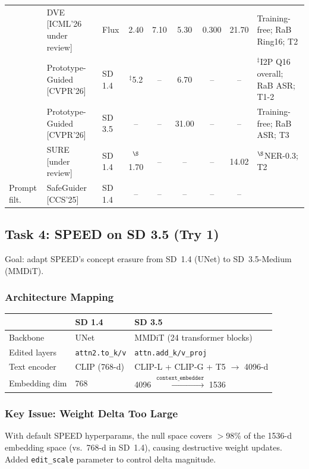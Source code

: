 \documentclass[11pt,a4paper]{article}
\begin{document}
\begin{table}[H]
\begin{tabularx}{\textwidth}{@{} p{1.5cm} p{2cm} l c c c c c X @{}}
 & DVE \scriptsize{[ICML'26 under review]} & Flux & 2.40 & 7.10 & 5.30 & 0.300 & 21.70 & Training-free; RaB Ring16; T2 \\
 & Prototype-Guided \scriptsize{[CVPR'26]} & SD 1.4 & $^\ddagger$5.2 & -- & 6.70 & -- & -- & $^\ddagger$I2P Q16 overall; RaB ASR; T1-2 \\
 & Prototype-Guided \scriptsize{[CVPR'26]} & SD 3.5 & -- & -- & 31.00 & -- & -- & Training-free; RaB ASR; T3 \\
 & SURE \scriptsize{[under review]} & SD 1.4 & $^\S$1.70 & -- & -- & -- & 14.02 & $^\S$NER-0.3; T2 \\
\midrule
Prompt filt. & SafeGuider \scriptsize{[CCS'25]} & SD 1.4 & -- & -- & -- & -- & -- & \\
\bottomrule
\end{tabularx}
\label{tab:defense}
\end{table}


\subsection{Task 4: SPEED on SD 3.5 (Try 1)}

Goal: adapt SPEED's concept erasure from SD~1.4 (UNet) to SD~3.5-Medium (MMDiT).

\subsubsection{Architecture Mapping}

\begin{tabular}{@{} l l l @{}}
\toprule
& \textbf{SD 1.4} & \textbf{SD 3.5} \\
\midrule
Backbone & UNet & MMDiT (24 transformer blocks) \\
Edited layers & \texttt{attn2.to\_k/v} & \texttt{attn.add\_k/v\_proj} \\
Text encoder & CLIP (768-d) & CLIP-L + CLIP-G + T5 $\to$ 4096-d \\
Embedding dim & 768 & 4096 $\xrightarrow{\texttt{context\_embedder}}$ 1536 \\
\bottomrule
\end{tabular}

\subsubsection{Key Issue: Weight Delta Too Large}

With default SPEED hyperparams, the null space covers $>$98\% of the 1536-d embedding space (vs.\ 768-d in SD~1.4), causing destructive weight updates. Added \texttt{edit\_scale} parameter to control delta magnitude.
\end{document}
